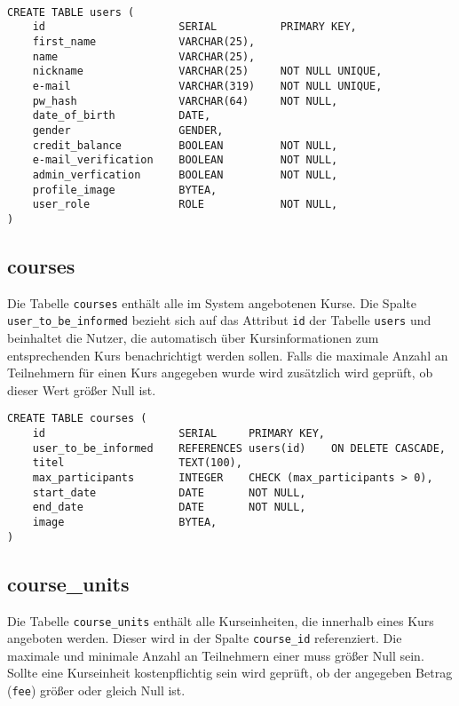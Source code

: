 \begin{verbatim}

CREATE TABLE users (
    id                     SERIAL          PRIMARY KEY,
    first_name             VARCHAR(25),
    name                   VARCHAR(25),
    nickname               VARCHAR(25)     NOT NULL UNIQUE,
    e-mail                 VARCHAR(319)    NOT NULL UNIQUE,
    pw_hash                VARCHAR(64)     NOT NULL,
    date_of_birth          DATE,
    gender                 GENDER,
    credit_balance         BOOLEAN         NOT NULL,
    e-mail_verification    BOOLEAN         NOT NULL,
    admin_verfication      BOOLEAN         NOT NULL,
    profile_image          BYTEA,
    user_role              ROLE            NOT NULL,
)
\end{verbatim}

\subsection{courses}
Die Tabelle \texttt{courses} enthält alle im System angebotenen Kurse. Die Spalte \texttt{user\_to\_be\_informed} bezieht sich auf das Attribut \texttt{id} der Tabelle \texttt{users} und beinhaltet die Nutzer, die automatisch über Kursinformationen zum entsprechenden Kurs benachrichtigt werden sollen. Falls die maximale Anzahl an Teilnehmern für einen Kurs angegeben wurde wird zusätzlich wird geprüft, ob dieser Wert größer Null ist.

\begin{verbatim}
CREATE TABLE courses (
    id                     SERIAL     PRIMARY KEY,
    user_to_be_informed    REFERENCES users(id)    ON DELETE CASCADE,
    titel                  TEXT(100),
    max_participants       INTEGER    CHECK (max_participants > 0),
    start_date             DATE       NOT NULL,
    end_date               DATE       NOT NULL,
    image                  BYTEA,
)
\end{verbatim}

\subsection{course\_units}
Die Tabelle \texttt{course\_units} enthält alle Kurseinheiten, die innerhalb eines Kurs angeboten werden. Dieser wird in der Spalte \texttt{course\_id} referenziert. Die maximale und minimale Anzahl an Teilnehmern einer muss größer Null sein. Sollte eine Kurseinheit kostenpflichtig sein wird geprüft, ob der angegeben Betrag (\texttt{fee}) größer oder gleich Null ist.

